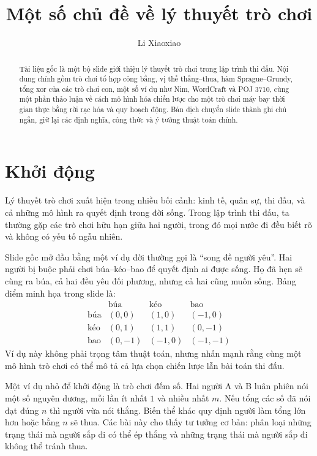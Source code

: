 \documentclass[11pt]{article}
\title{Một số chủ đề về lý thuyết trò chơi}
\author{Li Xiaoxiao}
\date{}
\begin{document}
\maketitle


\begin{abstract}
Tài liệu gốc là một bộ slide giới thiệu lý thuyết trò chơi trong lập trình thi
đấu. Nội dung chính gồm trò chơi tổ hợp công bằng, vị thế thắng--thua, hàm
Sprague--Grundy, tổng xor của các trò chơi con, một số ví dụ như Nim,
WordCraft và POJ 3710, cùng một phần thảo luận về cách mô hình hóa chiến lược
cho một trò chơi máy bay thời gian thực bằng rời rạc hóa và quy hoạch động.
Bản dịch chuyển slide thành ghi chú ngắn, giữ lại các định nghĩa, công thức và
ý tưởng thuật toán chính.
\end{abstract}

\tableofcontents

\section{Khởi động}

Lý thuyết trò chơi xuất hiện trong nhiều bối cảnh: kinh tế, quân sự, thi đấu,
và cả những mô hình ra quyết định trong đời sống. Trong lập trình thi đấu, ta
thường gặp các trò chơi hữu hạn giữa hai người, trong đó mọi nước đi đều biết
rõ và không có yếu tố ngẫu nhiên.

Slide gốc mở đầu bằng một ví dụ đời thường gọi là ``song đề người yêu''. Hai
người bị buộc phải chơi búa--kéo--bao để quyết định ai được sống. Họ đã hẹn sẽ
cùng ra búa, cả hai đều yêu đối phương, nhưng cả hai cũng muốn sống. Bảng điểm
minh họa trong slide là:
\[
\begin{array}{c|ccc}
 & \text{búa} & \text{kéo} & \text{bao}\\
\hline
\text{búa} &(0,0)&(1,0)&(-1,0)\\
\text{kéo}&(0,1)&(1,1)&(0,-1)\\
\text{bao}&(0,-1)&(-1,0)&(-1,-1)
\end{array}
\]
Ví dụ này không phải trọng tâm thuật toán, nhưng nhấn mạnh rằng cùng một mô
hình trò chơi có thể mô tả cả lựa chọn chiến lược lẫn bài toán thi đấu.

Một ví dụ nhỏ để khởi động là trò chơi đếm số. Hai người A và B luân phiên
nói một số nguyên dương, mỗi lần ít nhất \(1\) và nhiều nhất \(m\). Nếu tổng
các số đã nói đạt đúng \(n\) thì người vừa nói thắng. Biến thể khác quy định
người làm tổng lớn hơn hoặc bằng \(n\) sẽ thua. Các bài này cho thấy tư tưởng
cơ bản: phân loại những trạng thái mà người sắp đi có thể ép thắng và những
trạng thái mà người sắp đi không thể tránh thua.
\end{document}
